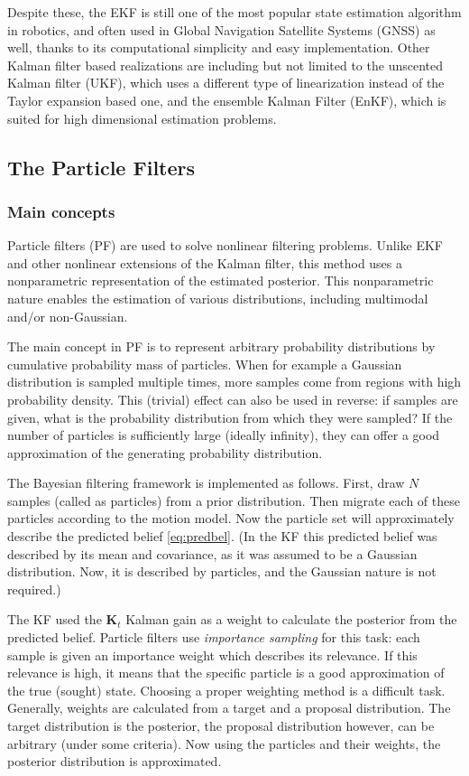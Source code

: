 Despite these, the EKF is still one of the most popular state estimation algorithm in robotics, and often used in Global Navigation Satellite Systems (GNSS) as well, thanks to its computational simplicity and easy  implementation. Other Kalman filter based realizations are including but not limited to the unscented Kalman filter (UKF), which uses a different type of linearization instead of the Taylor expansion based one, and the ensemble Kalman Filter (EnKF), which is suited for high dimensional estimation problems.

\subsection{The Particle Filters}
\subsubsection{Main concepts}

Particle filters (PF) are used to solve nonlinear filtering problems. Unlike EKF and other nonlinear extensions of the Kalman filter, this method uses a nonparametric representation of the estimated posterior. This nonparametric nature enables the estimation of various distributions, including multimodal and/or non-Gaussian.

The main concept in PF is to represent arbitrary probability distributions by cumulative probability mass of particles. When for example a Gaussian distribution is sampled multiple times, more samples come from regions with high probability density. This (trivial) effect can also be used in reverse: if samples are given, what is the probability distribution from which they were sampled? If the number of particles is sufficiently large (ideally infinity), they can offer a good approximation of the generating probability distribution.

The Bayesian filtering framework is implemented as follows. First, draw $N$ samples (called as particles) from a prior distribution. Then migrate each of these particles according to the motion model. Now the particle set will approximately describe the predicted belief \eqref{eq:predbel}. (In the KF this predicted belief was described by its mean and covariance, as it was assumed to be a Gaussian distribution. Now, it is described by particles, and the Gaussian nature is not required.)

The KF used the $\mathbf{K}_t$ Kalman gain as a weight to calculate the posterior from the predicted belief. Particle filters use \emph{importance sampling} for this task: each sample is given an importance weight which describes its relevance. If this relevance is high, it means that the specific particle is a good approximation of the true (sought) state. Choosing a proper weighting method is a difficult task. Generally, weights are calculated from a target and a proposal distribution. The target distribution is the posterior, the proposal distribution however, can be arbitrary (under some criteria). Now using the particles and their weights, the posterior distribution is approximated.

